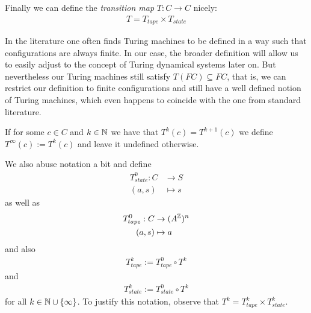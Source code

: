Finally we can define the \emph{transition map} $T:C\to C$ nicely:
\begin{align*}
	T = T_{tape} \times T_{state}
\end{align*}
\begin{Remark}
	In the literature one often finds Turing machines to be defined in a way such that configurations are always finite. In our case, the broader definition will allow us to easily adjust to the concept of Turing dynamical systems later on.
	But nevertheless our Turing machines still satisfy $T(FC) \subseteq FC$, that is, we can restrict our definition to finite configurations and still have a well defined notion of Turing machines, which even happens to coincide with the one from standard literature.
\end{Remark}

If for some $c \in C$ and $k \in \mathbb{N}$ we have that $T^k(c) = T^{k+1}(c)$ we define $T^\infty(c) := T^k(c)$ and leave it undefined otherwise.

We also abuse notation a bit and define
\begin{align*}
	T_{state}^0: C &\to S \\
	(a,s) &\mapsto s
\end{align*}
as well as
\begin{align*}
	T_{tape}^0: C &\to (A^{\mathbb{Z}})^n \\
	(a,s) &\mapsto a
\end{align*}
and also
\begin{align*}
	T_{tape}^k := T_{tape}^0 \circ T^k
\end{align*}
and
\begin{align*}
	T_{state}^k := T_{state}^0 \circ T^k
\end{align*}
for all $k \in \mathbb{N} \cup \{\infty\}$.
To justify this notation, observe that $T^k = T_{tape}^k \times T_{state}^k$.

